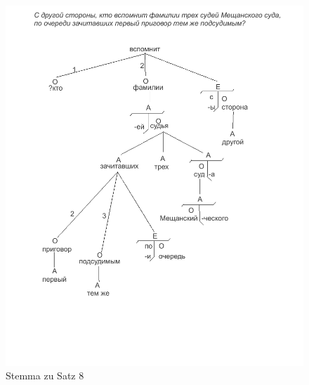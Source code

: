 \begin{figure}
    \begin{center}
        \includegraphics{anhang_a/stemma8}
        \caption{Stemma zu Satz 8}
        \label{fig:stemma8}
    \end{center}
\end{figure}

